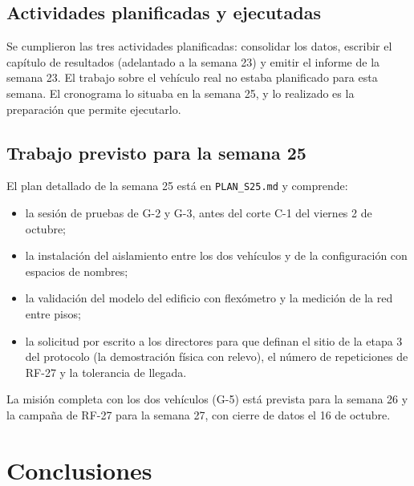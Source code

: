 \documentclass[12pt,letterpaper]{article}
\begin{document}
\subsection{Actividades planificadas y ejecutadas}

Se cumplieron las tres actividades planificadas: consolidar los datos, escribir el capítulo de resultados (adelantado a la semana 23) y emitir el informe de la semana 23. El trabajo sobre el vehículo real no estaba planificado para esta semana. El cronograma lo situaba en la semana 25, y lo realizado es la preparación que permite ejecutarlo.

\subsection{Trabajo previsto para la semana 25}

El plan detallado de la semana 25 está en \texttt{PLAN\_S25.md} y comprende:

\begin{itemize}[leftmargin=*]
    \item la sesión de pruebas de G-2 y G-3, antes del corte C-1 del viernes 2 de octubre;
    \item la instalación del aislamiento entre los dos vehículos y de la configuración con espacios de nombres;
    \item la validación del modelo del edificio con flexómetro y la medición de la red entre pisos;
    \item la solicitud por escrito a los directores para que definan el sitio de la etapa 3 del protocolo (la demostración física con relevo), el número de repeticiones de RF-27 y la tolerancia de llegada.
\end{itemize}

La misión completa con los dos vehículos (G-5) está prevista para la semana 26 y la campaña de RF-27 para la semana 27, con cierre de datos el 16 de octubre.

\section{Conclusiones}
\end{document}
